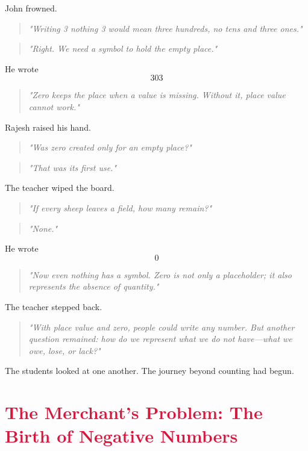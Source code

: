 \documentclass[11pt]{article}
\begin{document}
John frowned.
\begin{quote}
\emph{"Writing 3 nothing 3 would mean three hundreds, no tens and three ones."}
\end{quote}
\begin{quote}
\emph{"Right. We need a symbol to hold the empty place."}
\end{quote}
He wrote
\[303\]
\begin{quote}
\emph{"Zero keeps the place when a value is missing. Without it, place value cannot work."}
\end{quote}
Rajesh raised his hand.
\begin{quote}
\emph{"Was zero created only for an empty place?"}
\end{quote}
\begin{quote}
\emph{"That was its first use."}
\end{quote}
The teacher wiped the board.
\begin{quote}
\emph{"If every sheep leaves a field, how many remain?"}
\end{quote}
\begin{quote}
\emph{"None."}
\end{quote}
He wrote
\[0\]
\begin{quote}
\emph{"Now even nothing has a symbol. Zero is not only a placeholder; it also represents the absence of quantity."}
\end{quote}
The teacher stepped back.
\begin{quote}
\emph{"With place value and zero, people could write any number. But another question remained: how do we represent what we do not have—what we owe, lose, or lack?"}
\end{quote}
The students looked at one another. The journey beyond counting had begun.


\section*{\textcolor{crimson}{The Merchant's Problem: The Birth of Negative Numbers}}
\end{document}
